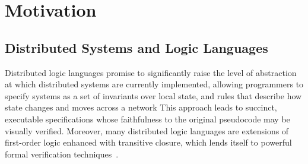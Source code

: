 \section{Motivation}

\subsection{Distributed Systems and Logic Languages}
\label{sec:dsll}


Distributed logic languages promise to significantly raise the level of
abstraction at which distributed systems are currently implemented, allowing
programmers to specify systems as a set of invariants over local state,
and rules that describe how state changes and moves across a network 
This approach leads to succinct, executable specifications whose faithfulness to the original pseudocode may be visually verified.
Moreover, many 
distributed logic languages are extensions of first-order logic enhanced with
transitive closure, which lends itself to powerful
formal verification techniques~\cite{wang, wang2}.


